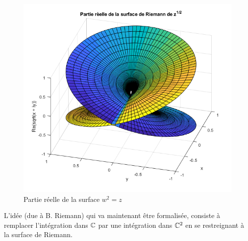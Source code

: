 \begin{figure}[hbt]
\begin{center}\includegraphics[scale=0.46]{images/Surf_Riema_sqrt_Re.PNG}
\end{center}
\caption{Partie réelle de la surface $w^2=z$}\label{fig:sqrt_}
\end{figure}

L'idée (due à B. Riemann) qui va maintenant être formalisée, consiste à remplacer l'intégration dans $\mathbb{C}$ par une intégration dans $\mathbb{C}^2$ en se restreignant à la surface de Riemann.
